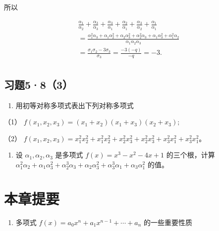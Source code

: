 所以

\[
\begin{array}{l} \frac {\alpha_ {1}}{\alpha_ {2}} + \frac {\alpha_ {3}}{\alpha_ {3}} + \frac {\alpha_ {3}}{\alpha_ {1}} + \frac {\alpha_ {2}}{\alpha_ {1}} + \frac {\alpha_ {3}}{\alpha_ {2}} + \frac {\alpha_ {1}}{\alpha_ {1}} \\ = \frac {\alpha_ {1} ^ {2} \alpha_ {3} + \alpha_ {1} \alpha_ {2} ^ {2} + \alpha_ {2} \alpha_ {3} ^ {2} + \alpha_ {2} ^ {2} \alpha_ {3} + \alpha_ {1} \alpha_ {3} ^ {2} + \alpha_ {1} ^ {2} \alpha_ {2}}{\alpha_ {1} \alpha_ {2} \alpha_ {3}} \\ = \frac {\sigma_ {1} \sigma_ {2} - 3 \sigma_ {3}}{\sigma_ {3}} = \frac {- 3 (- q)}{- q} = - 3. \\ \end{array}
\]

\subsection{习题5·8（3）}

\begin{enumerate}
\item
  用初等对称多项式表出下列对称多项式
\end{enumerate}

（1）
\(f(x_{1},x_{2},x_{3}) = (x_{1} + x_{2})(x_{1} + x_{3})(x_{2} + x_{3});\)

（2）
\(f(x_{1},x_{2},x_{3}) = x_{1}^{2}x_{2}^{2} + x_{1}^{2}x_{2}^{2} + x_{2}^{2}x_{3}^{2} + x_{2}^{2}x_{3}^{2} + x_{3}^{2}x_{1}^{2} + x_{3}^{2}x_{1}^{2}\)。

\begin{enumerate}[start=2]
\item
  设 \(\alpha_{1}, \alpha_{2}, \alpha_{3}\) 是多项式
  \(f(x) = x^{3} - x^{2} - 4x + 1\) 的三个根，计算
  \(\alpha_{1}^{2}\alpha_{2} + \alpha_{1}\alpha_{3}^{2} + \alpha_{2}^{3}\alpha_{3} + \alpha_{2}\alpha_{3}^{2} + \alpha_{3}^{3}\alpha_{1} + \alpha_{3}\alpha_{1}^{2}\)
  的值。
\end{enumerate}

\section{本章提要}

\begin{enumerate}
\item
  多项式 \(f(x) = a_0 x^n + a_1 x^{n-1} + \cdots + a_n\) 的一些重要性质
\end{enumerate}

